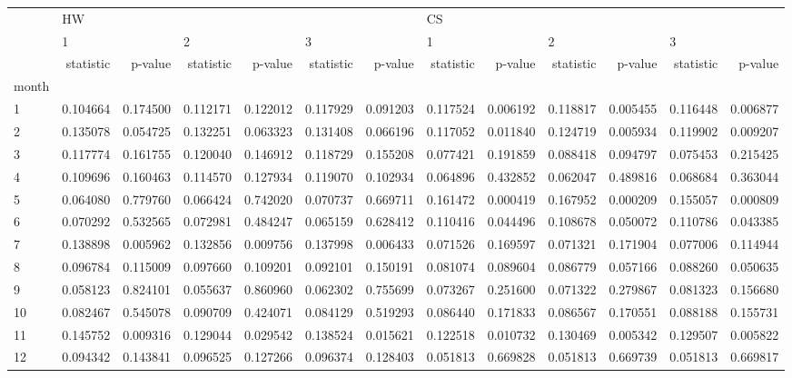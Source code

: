 \begin{tabular}{lrrrrrrrrrrrr}
\toprule
{} & \multicolumn{6}{l}{HW} & \multicolumn{6}{l}{CS} \\
{} & \multicolumn{2}{l}{1} & \multicolumn{2}{l}{2} & \multicolumn{2}{l}{3} & \multicolumn{2}{l}{1} & \multicolumn{2}{l}{2} & \multicolumn{2}{l}{3} \\
{} & statistic &   p-value & statistic &   p-value & statistic &   p-value & statistic &   p-value & statistic &   p-value & statistic &   p-value \\
month &           &           &           &           &           &           &           &           &           &           &           &           \\
\midrule
1     &  0.104664 &  0.174500 &  0.112171 &  0.122012 &  0.117929 &  0.091203 &  0.117524 &  0.006192 &  0.118817 &  0.005455 &  0.116448 &  0.006877 \\
2     &  0.135078 &  0.054725 &  0.132251 &  0.063323 &  0.131408 &  0.066196 &  0.117052 &  0.011840 &  0.124719 &  0.005934 &  0.119902 &  0.009207 \\
3     &  0.117774 &  0.161755 &  0.120040 &  0.146912 &  0.118729 &  0.155208 &  0.077421 &  0.191859 &  0.088418 &  0.094797 &  0.075453 &  0.215425 \\
4     &  0.109696 &  0.160463 &  0.114570 &  0.127934 &  0.119070 &  0.102934 &  0.064896 &  0.432852 &  0.062047 &  0.489816 &  0.068684 &  0.363044 \\
5     &  0.064080 &  0.779760 &  0.066424 &  0.742020 &  0.070737 &  0.669711 &  0.161472 &  0.000419 &  0.167952 &  0.000209 &  0.155057 &  0.000809 \\
6     &  0.070292 &  0.532565 &  0.072981 &  0.484247 &  0.065159 &  0.628412 &  0.110416 &  0.044496 &  0.108678 &  0.050072 &  0.110786 &  0.043385 \\
7     &  0.138898 &  0.005962 &  0.132856 &  0.009756 &  0.137998 &  0.006433 &  0.071526 &  0.169597 &  0.071321 &  0.171904 &  0.077006 &  0.114944 \\
8     &  0.096784 &  0.115009 &  0.097660 &  0.109201 &  0.092101 &  0.150191 &  0.081074 &  0.089604 &  0.086779 &  0.057166 &  0.088260 &  0.050635 \\
9     &  0.058123 &  0.824101 &  0.055637 &  0.860960 &  0.062302 &  0.755699 &  0.073267 &  0.251600 &  0.071322 &  0.279867 &  0.081323 &  0.156680 \\
10    &  0.082467 &  0.545078 &  0.090709 &  0.424071 &  0.084129 &  0.519293 &  0.086440 &  0.171833 &  0.086567 &  0.170551 &  0.088188 &  0.155731 \\
11    &  0.145752 &  0.009316 &  0.129044 &  0.029542 &  0.138524 &  0.015621 &  0.122518 &  0.010732 &  0.130469 &  0.005342 &  0.129507 &  0.005822 \\
12    &  0.094342 &  0.143841 &  0.096525 &  0.127266 &  0.096374 &  0.128403 &  0.051813 &  0.669828 &  0.051813 &  0.669739 &  0.051813 &  0.669817 \\
\bottomrule
\end{tabular}
